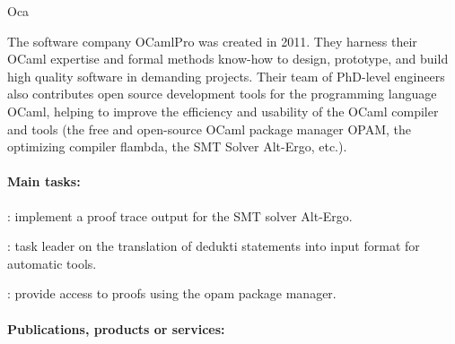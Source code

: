 \begin{sitedescription}{Oca}



The software company OCamlPro was created in 2011. They harness their OCaml expertise and formal methods know-how to design, prototype, and build high quality software in demanding projects. Their team of PhD-level engineers also contributes open source development tools for the programming language OCaml, helping to improve the efficiency and usability of the OCaml compiler and tools (the free and open-source OCaml package manager OPAM, the optimizing compiler flambda, the SMT Solver Alt-Ergo, etc.).

\paragraph*{Main tasks:}


\begin{compactitem}
\item {}: implement a proof trace output for the SMT solver Alt-Ergo.
\item {}: task leader on the translation of dedukti statements into input format for automatic tools.
\item {}: provide access to proofs using the opam package manager.
\end{compactitem}

\paragraph*{Publications, products or services:}



\end{sitedescription}
